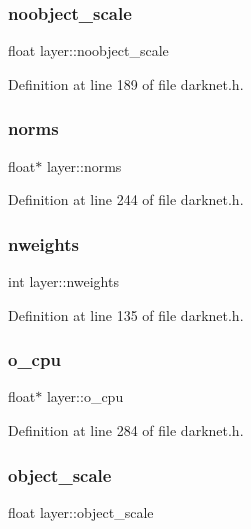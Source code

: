 \subsubsection{\texorpdfstring{noobject\_scale}{noobject\_scale}}
{\footnotesize\ttfamily float layer\+::noobject\+\_\+scale}



Definition at line 189 of file darknet.\+h.

\mbox{\label{structlayer_acb730788dd9a0c77c7e501b9118a2933}} 
\subsubsection{\texorpdfstring{norms}{norms}}
{\footnotesize\ttfamily float$\ast$ layer\+::norms}



Definition at line 244 of file darknet.\+h.

\mbox{\label{structlayer_a76a23567dbc4b223d8ba3c34c0f5e82f}} 
\subsubsection{\texorpdfstring{nweights}{nweights}}
{\footnotesize\ttfamily int layer\+::nweights}



Definition at line 135 of file darknet.\+h.

\mbox{\label{structlayer_ae0b82851bad0a9588a448e93bf6ba5cc}} 
\subsubsection{\texorpdfstring{o\_cpu}{o\_cpu}}
{\footnotesize\ttfamily float$\ast$ layer\+::o\+\_\+cpu}



Definition at line 284 of file darknet.\+h.

\mbox{\label{structlayer_a502c7f71d253c01f1724adbe8bc585fc}} 
\subsubsection{\texorpdfstring{object\_scale}{object\_scale}}
{\footnotesize\ttfamily float layer\+::object\+\_\+scale}



